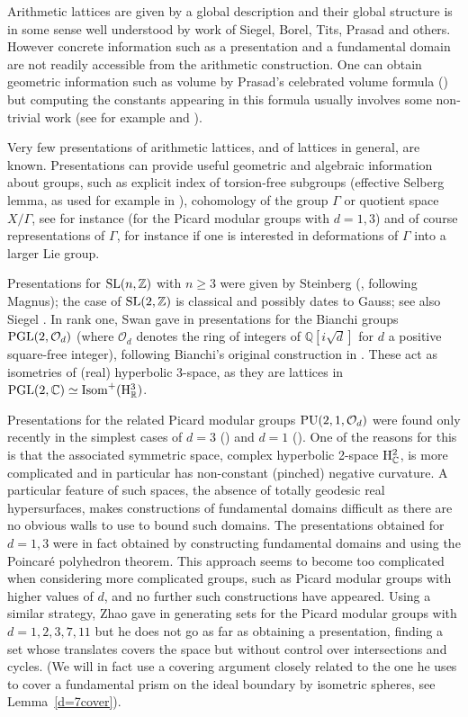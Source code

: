 \documentclass{article}[12pt]
\newcommand{\C}{\mathbb{C}}
\newcommand{\R}{\mathbb{R}}
\newcommand{\Z}{\mathbb{Z}}
\newcommand{\Q}{\mathbb{Q}}
\begin{document}
Arithmetic lattices are given by a global description and their global structure is in some sense well understood by work of Siegel, Borel, Tits, Prasad and others. However concrete information such as a presentation and a fundamental domain are not readily accessible from the arithmetic construction. One can obtain geometric information such as volume by Prasad's celebrated volume formula (\cite{Pr}) but computing the constants appearing in this formula usually involves some non-trivial work (see for example \cite{Be} and \cite{Sto}). 

Very few presentations of arithmetic lattices, and of lattices in general, are known. 
Presentations can provide useful geometric and algebraic information about groups, such as explicit index of torsion-free subgroups (effective Selberg lemma, as used for example in \cite{Sto}), cohomology of the group $\Gamma$ or quotient space $X/\Gamma$, see for instance \cite{Y} (for the Picard modular groups with $d=1,3$) and of course representations of $\Gamma$, for instance if one is interested in deformations of $\Gamma$ into a larger Lie group.

Presentations for ${\rm SL}(n,\Z)$ with $n \geqslant 3$ were given by Steinberg (\cite{Ste}, following  Magnus); the case of ${\rm SL}(2,\Z)$ is classical and possibly dates to Gauss; see also Siegel \cite{Si}. In rank one, Swan gave in \cite{Sw} presentations for the Bianchi groups ${\rm PGL}(2,\mathcal{O}_d)$ (where $\mathcal{O}_d$ denotes the ring of integers of $\Q [i\sqrt{d}]$ for $d$ a positive square-free integer), following Bianchi's original construction in \cite{Bi}. These act as isometries of (real) hyperbolic 3-space, as they are lattices in ${\rm PGL}(2,\C) \simeq {\rm Isom}^+({\rm H}_\R^3)$.

Presentations for the related Picard modular groups ${\rm PU}(2,1,\mathcal{O}_d)$ were found only recently in the simplest cases of $d=3$ (\cite{FP}) and $d=1$ (\cite{FFP}). One of the reasons for this is that the associated symmetric space, complex hyperbolic 2-space ${\rm H}^2_\C$, is more complicated and in particular has non-constant (pinched) negative curvature. A particular feature of such spaces, the absence of totally geodesic real hypersurfaces, makes constructions of fundamental domains difficult as there are no obvious walls to use to bound such domains. The presentations obtained for $d=1,3$ were in fact obtained by constructing fundamental domains and using the Poincar\'e polyhedron theorem. This approach seems to become too complicated when considering more complicated groups, such as Picard modular groups with higher values of $d$, and no further such constructions have appeared. Using a similar strategy, Zhao gave in \cite{Zh} generating sets for the Picard modular groups with $d=1,2,3,7,11$ but he does not go as far as obtaining a presentation, finding a set whose translates covers the space but without control over intersections and cycles. (We will in fact use a covering argument closely related to the one he uses to cover a fundamental prism on the ideal boundary by isometric spheres, see Lemma~\ref{d=7cover}).
\end{document}
